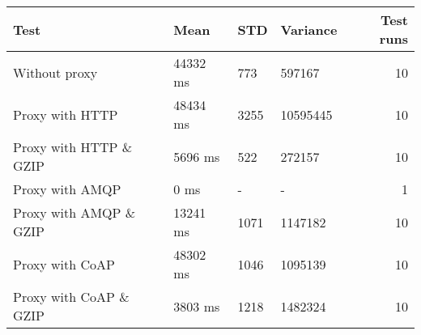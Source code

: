 \begin{tabularx}{\textwidth}{llllr}
\hline
 Test                   & Mean     & STD   & Variance   &   Test runs \\
\hline
 Without proxy          & 44332 ms & 773   & 597167     &          10 \\
 Proxy with HTTP        & 48434 ms & 3255  & 10595445   &          10 \\
 Proxy with HTTP \& GZIP & 5696 ms  & 522   & 272157     &          10 \\
 Proxy with AMQP        & 0 ms     & -     & -          &           1 \\
 Proxy with AMQP \& GZIP & 13241 ms & 1071  & 1147182    &          10 \\
 Proxy with CoAP        & 48302 ms & 1046  & 1095139    &          10 \\
 Proxy with CoAP \& GZIP & 3803 ms  & 1218  & 1482324    &          10 \\
\hline
\end{tabularx}